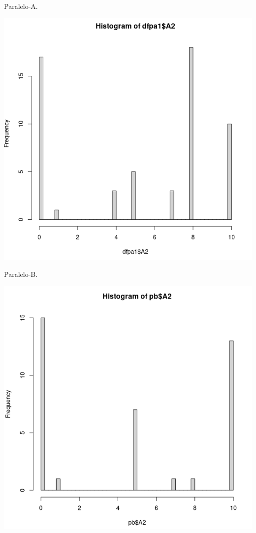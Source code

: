 \documentclass[a4pa<per,12pt,spanish]{article}
\begin{document}
\begin{minipage}[h]{0.45\linewidth}
Paralelo-A.

\includegraphics[scale=0.3]{images/histoA2.png}
\end{minipage}
\begin{minipage}[h]{0.45\linewidth}
Paralelo-B.

\includegraphics[scale=0.3]{images/histo-PB-A2.png}
\end{minipage}
\end{document}
